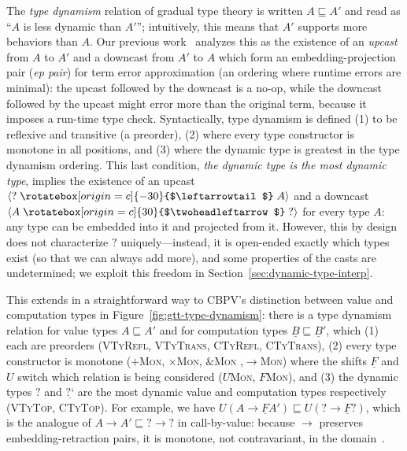 \documentclass[acmsmall,screen,12pt]{acmart}
\renewcommand{\u}{\underline}
\newcommand{\ltdyn}{\sqsubseteq}
\newcommand{\dynv}{{?}}
\newcommand{\dync}{\u {\text{?`}}}
\newcommand{\uarrow}{\mathrel{\rotatebox[origin=c]{-30}{$\leftarrowtail$}}}
\newcommand{\darrow}{\mathrel{\rotatebox[origin=c]{30}{$\twoheadleftarrow$}}}
\newcommand{\upcast}[2]{\langle{#2}\uarrow{#1}\rangle}
\newcommand{\dncast}[2]{\langle{#1}\darrow{#2}\rangle}
\newcommand{\with}{\mathbin{\&}}
\begin{document}
The \emph{type dynamism} relation of gradual type theory is written $A
\ltdyn A'$ and read as ``$A$ is less dynamic than $A'$''; intuitively,
this means that $A'$ supports more behaviors than $A$.
Our previous work~\citep{newahmed18,newlicata2018-fscd} analyzes this as the existence of an \emph{upcast}
from $A$ to $A'$ and a downcast from $A'$ to $A$ which form an
embedding-projection pair (\emph{ep pair}) for term error approximation
(an ordering where runtime errors are minimal): the upcast followed by the
downcast is a no-op, while the downcast followed by the upcast might
error more than the original term, because it imposes a run-time type
check.  Syntactically, type dynamism is defined (1) to be reflexive and
transitive (a preorder), (2) where every type constructor is monotone in
all positions, and (3) where the dynamic type is greatest in the type
dynamism ordering.  This last condition, \emph{the
  dynamic type is the most dynamic type}, implies the existence of an
upcast $\upcast{A}{\dynv}$ and a downcast $\dncast{A}{\dynv}$ for every
type $A$: any type can be embedded
into it and projected from it.  However, this by design does not
characterize $\dynv$ uniquely---instead, it is open-ended exactly
which types exist (so that we can always add more), and some properties
of the casts are undetermined; we exploit this freedom in
Section~\ref{sec:dynamic-type-interp}.

This extends in a straightforward way to CBPV's distinction between
value and computation types in Figure~\ref{fig:gtt-type-dynamism}: there
is a type dynamism relation for value types $A \ltdyn A'$ and for
computation types $\u B \ltdyn \u B'$, which (1) each are preorders
(\textsc{VTyRefl}, \textsc{VTyTrans}, \textsc{CTyRefl}, \textsc{CTyTrans}),
(2) every type constructor is monotone
(\textsc{$+$Mon}, \textsc{$\times$Mon}, \textsc{$\with$Mon} ,\textsc{$\to$Mon})
where the shifts $\u F$ and $U$ switch which relation is being
considered (\textsc{$U$Mon}, \textsc{$F$Mon}), and (3) the dynamic types
$\dynv$ and $\dync$ are the most dynamic value and computation types
respectively (\textsc{VTyTop}, \textsc{CTyTop}).  For example, we have
$U(A \to \u F A') \ltdyn U(\dynv \to \u F \dynv)$, which is the analogue
of $A \to A' \ltdyn \dynv \to \dynv$ in call-by-value: because $\to$
preserves embedding-retraction pairs, it is monotone, not contravariant,
in the domain~\citep{newahmed18,newlicata2018-fscd}.
\end{document}
